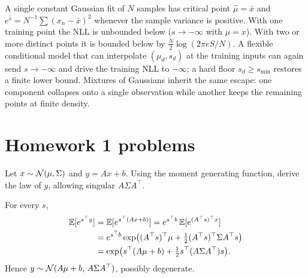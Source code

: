 A single constant Gaussian fit of $N$ samples has critical point $\hat\mu=\bar x$ and $e^{\hat s}=N^{-1}\sum(x_n-\bar x)^2$ whenever the sample variance is positive. With one training point the NLL is unbounded below ($s\to-\infty$ with $\mu=x$). With two or more distinct points it is bounded below by $\tfrac N2\log(2\pi e S/N)$. A flexible conditional model that can interpolate $(\mu_d,s_d)$ at the training inputs can again send $s\to-\infty$ and drive the training NLL to $-\infty$; a hard floor $s_d\ge s_{\min}$ restores a finite lower bound. Mixtures of Gaussians inherit the same escape: one component collapses onto a single observation while another keeps the remaining points at finite density.

\section{Homework 1 problems}

\begin{hwqbox}
Let $x\sim\mathcal{N}(\mu,\Sigma)$ and $y=Ax+b$. Using the moment generating function, derive the law of $y$, allowing singular $A\Sigma A^\top$.
\end{hwqbox}
\begin{hwsolbox}
For every $s$,
\begin{align*}
\mathbb{E}[e^{s^\top y}]
&=\mathbb{E}[e^{s^\top(Ax+b)}]
=e^{s^\top b}\,\mathbb{E}[e^{(A^\top s)^\top x}]\\
&=e^{s^\top b}\exp\bigl((A^\top s)^\top\mu+\tfrac12(A^\top s)^\top\Sigma A^\top s\bigr)\\
&=\exp\bigl(s^\top(A\mu+b)+\tfrac12 s^\top(A\Sigma A^\top)s\bigr).
\end{align*}
Hence $y\sim\mathcal{N}(A\mu+b,\,A\Sigma A^\top)$, possibly degenerate.
\end{hwsolbox}


